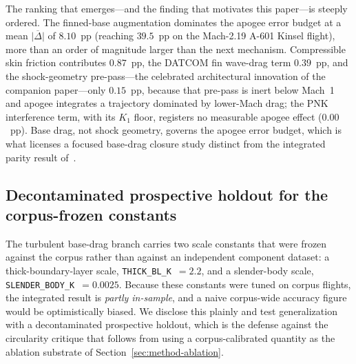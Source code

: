 The ranking that emerges---and the finding that motivates this paper---is steeply
ordered. The finned-base augmentation dominates the apogee error budget at a mean
$\overline{|\Delta|}$ of $8.10$~pp (reaching $39.5$~pp on the Mach-2.19 A-601
Kinsel flight), more than an order of magnitude larger than the next mechanism.
Compressible skin friction contributes $0.87$~pp, the DATCOM fin wave-drag term
$0.39$~pp, and the shock-geometry pre-pass---the celebrated architectural
innovation of the companion paper---only $0.15$~pp, because that pre-pass is inert
below Mach~1 and apogee integrates a trajectory dominated by lower-Mach drag; the
PNK interference term, with its $K_{1}$ floor, registers no measurable apogee
effect ($0.00$~pp). Base drag, not shock geometry, governs the apogee error
budget, which is what licenses a focused base-drag closure study distinct from the
integrated parity result of~\cite{yu2026jsr}.

\subsection{Decontaminated prospective holdout for the corpus-frozen constants}
\label{sec:method-holdout}

The turbulent base-drag branch carries two scale constants that were frozen
against the corpus rather than against an independent component dataset: a
thick-boundary-layer scale, \texttt{THICK\_BL\_K}~$=2.2$, and a slender-body
scale, \texttt{SLENDER\_BODY\_K}~$=0.0025$. Because these constants were tuned on
corpus flights, the integrated result is \emph{partly in-sample}, and a naive
corpus-wide accuracy figure would be optimistically biased. We disclose this
plainly and test generalization with a decontaminated prospective holdout, which
is the defense against the circularity critique that follows from using a
corpus-calibrated quantity as the ablation substrate of
Section~\ref{sec:method-ablation}.

